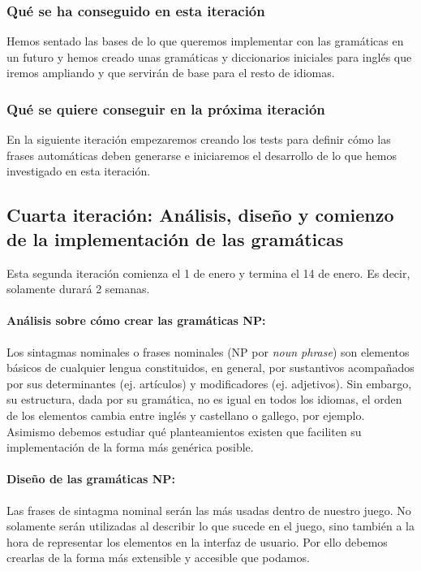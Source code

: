 \subsubsection{Qué se ha conseguido en esta iteración}

Hemos sentado las bases de lo que queremos implementar con las gramáticas en un futuro y hemos creado unas gramáticas y diccionarios iniciales para inglés que iremos ampliando y que servirán de base para el resto de idiomas.

\subsubsection{Qué se quiere conseguir en la próxima iteración}

En la siguiente iteración empezaremos creando los tests para definir cómo las frases automáticas deben generarse e iniciaremos el desarrollo de lo que hemos investigado en esta iteración.

\subsection{Cuarta iteración: Análisis, diseño y comienzo de la implementación de las gramáticas}

Esta segunda iteración comienza el 1 de enero y termina el 14 de enero. Es decir, solamente durará 2 semanas.

\paragraph{Análisis sobre cómo crear las gramáticas NP:} Los sintagmas nominales o frases nominales (NP por \emph{noun phrase}) son elementos básicos de cualquier lengua constituidos, en general, por sustantivos acompañados por sus determinantes (ej. artículos) y modificadores (ej. adjetivos). Sin embargo, su estructura, dada por su gramática, no es igual en todos los idiomas, el orden de los elementos cambia entre inglés y castellano o gallego, por ejemplo. Asimismo debemos estudiar qué planteamientos existen que faciliten su implementación de la forma más genérica posible.

\paragraph{Diseño de las gramáticas NP:} Las frases de sintagma nominal serán las más usadas dentro de nuestro juego. No solamente serán utilizadas al describir lo que sucede en el juego, sino también a la hora de representar los elementos en la interfaz de usuario. Por ello debemos crearlas de la forma más extensible y accesible que podamos.


